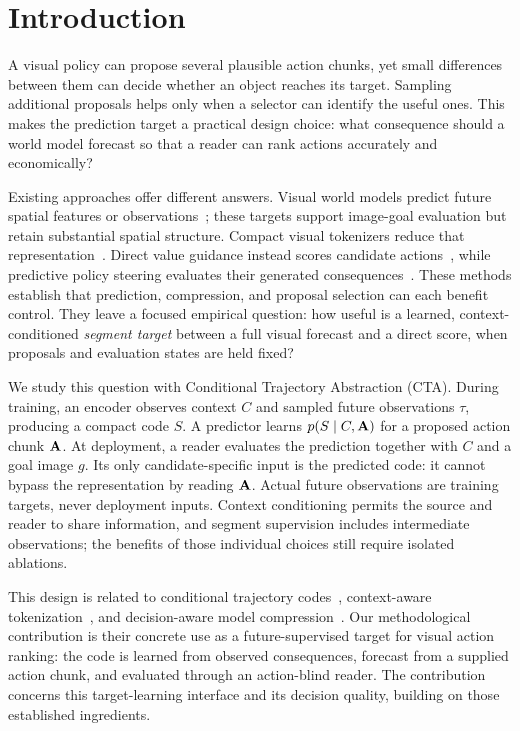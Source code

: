 \section{Introduction}
\label{sec:intro}
A visual policy can propose several plausible action chunks, yet small differences between them can decide whether an object reaches its target. Sampling additional proposals helps only when a selector can identify the useful ones. This makes the prediction target a practical design choice: what consequence should a world model forecast so that a reader can rank actions accurately and economically?

Existing approaches offer different answers. Visual world models predict future spatial features or observations~\cite{zhou2025dinowm,assran2025vjepa2}; these targets support image-goal evaluation but retain substantial spatial structure. Compact visual tokenizers reduce that representation~\cite{kim2026compact}. Direct value guidance instead scores candidate actions~\cite{nakamoto2024vgps}, while predictive policy steering evaluates their generated consequences~\cite{qi2025gpc,cui2026dreamsteer}. These methods establish that prediction, compression, and proposal selection can each benefit control. They leave a focused empirical question: how useful is a learned, context-conditioned \emph{segment target} between a full visual forecast and a direct score, when proposals and evaluation states are held fixed?

We study this question with Conditional Trajectory Abstraction (CTA). During training, an encoder observes context $C$ and sampled future observations $\tau$, producing a compact code $S$. A predictor learns $p(S\mid C,\mathbf{A})$ for a proposed action chunk $\mathbf{A}$. At deployment, a reader evaluates the prediction together with $C$ and a goal image $g$. Its only candidate-specific input is the predicted code: it cannot bypass the representation by reading $\mathbf{A}$. Actual future observations are training targets, never deployment inputs. Context conditioning permits the source and reader to share information, and segment supervision includes intermediate observations; the benefits of those individual choices still require isolated ablations.

This design is related to conditional trajectory codes~\cite{jiang2023tap}, context-aware tokenization~\cite{micheli2024deltairis}, and decision-aware model compression~\cite{grimm2020value,arumugam2022deciding}. Our methodological contribution is their concrete use as a future-supervised target for visual action ranking: the code is learned from observed consequences, forecast from a supplied action chunk, and evaluated through an action-blind reader. The contribution concerns this target-learning interface and its decision quality, building on those established ingredients.

